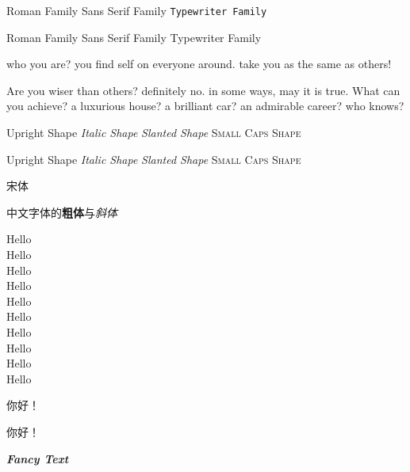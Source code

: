 \documentclass[12pt]{article}  %
\newcommand{\myfont}{\textit{\textbf{\textsf{Fancy Text}}}}  %
\begin{document}
    
    \textrm{Roman Family} \textsf{Sans Serif Family} \texttt{Typewriter Family}  %

    {\rmfamily Roman Family} {\sffamily Sans Serif Family} {\ttfamily Typewriter Family}

    \sffamily who you are? you find self on everyone around.
    take you as the same as others!

    {\ttfamily Are you wiser than others? definitely no. in some ways, may it is true. What can you achieve? a luxurious house? a brilliant car? an admirable career? who knows?}

    \textup{Upright Shape} \textit{Italic Shape} \textsl{Slanted Shape} \textsc{Small Caps Shape}

    {\upshape Upright Shape} {\itshape Italic Shape} {\slshape Slanted Shape} {\scshape Small Caps Shape}

    {\songti 宋体}   

    中文字体的\textbf{粗体}与\textit{斜体}  %

    {\tiny          Hello}\\
    {\scriptsize    Hello}\\
    {\footnotesize  Hello}\\
    {\small         Hello}\\
    {\normalsize    Hello}\\
    {\large         Hello}\\
    {\Large         Hello}\\
    {\LARGE         Hello}\\
    {\huge          Hello}\\
    {\Huge          Hello}

     你好！  %

     你好！  %

    \myfont
    
\end{document}
